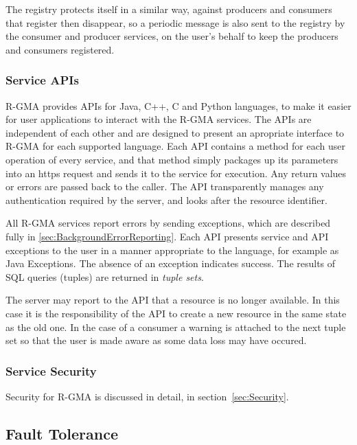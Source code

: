 The registry protects itself in a similar way, against producers and consumers that
register then disappear, so a periodic message is also
sent to the registry by the consumer and producer services, on the
user's behalf to keep the producers and consumers registered.

\subsubsection{Service APIs}

R-GMA provides APIs for Java, C++, C and Python languages, to make it
easier for user applications to interact with the R-GMA services.  The
APIs are independent of each other and are designed to present an
apropriate interface to R-GMA for each supported language.  Each API
contains a method for each user operation of every service, and that
method simply packages up its parameters into an https request and
sends it to the service for execution. Any return values or errors are
passed back to the caller. The API transparently manages any
authentication required by the server, and looks after the resource
identifier.

All R-GMA services report errors by sending 
exceptions, which are described fully in 
\ref{sec:BackgroundErrorReporting}. Each API presents service and API 
exceptions to the user in a manner appropriate to the language, for example as 
Java Exceptions. The absence of an exception indicates success. The results of 
SQL queries (tuples) are returned in \textit{tuple sets}.

The server may report to the API that a resource is no longer available. In this
case it is the responsibility of the API to create a new resource in the same
state as the old one. In the case of a consumer a warning is attached to the
next tuple set so that the user is made aware as some data loss may have
occured.

\subsubsection{Service Security}

Security for R-GMA is discussed in detail, in
section~\ref{sec:Security}.  

\subsection{Fault Tolerance}
